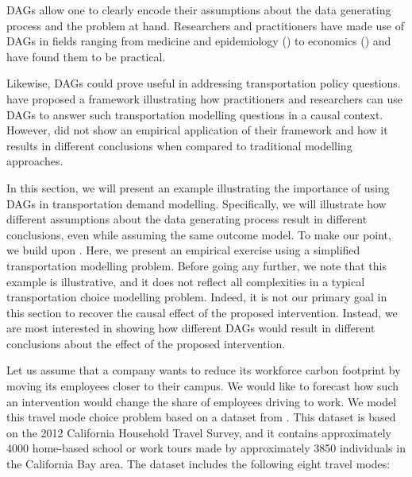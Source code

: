 DAGs allow one to clearly encode their assumptions about the data generating process and the problem at hand.
Researchers and practitioners have made use of DAGs in fields ranging from medicine and epidemiology (\citet{shrier_2008_reducing, sung_2012_reducing}) to economics (\citet{white_2011_covariate}) and have found them to be practical.

Likewise, DAGs could prove useful in addressing transportation policy questions.
\citet{brathwaite_2018_causal} have proposed a framework illustrating how practitioners and researchers can use DAGs to answer such transportation modelling questions in a causal context.
However, \citet{brathwaite_2018_causal} did not show an empirical application of their framework and how it results in different conclusions when compared to traditional modelling approaches.

In this section, we will present an example illustrating the importance of using DAGs in transportation demand modelling.
Specifically, we will illustrate how different assumptions about the data generating process result in different conclusions, even while assuming the same outcome model.
To make our point, we build upon \citet{brathwaite_2018_causal}.
Here, we present an empirical exercise using a simplified transportation modelling problem.
Before going any further, we note that this example is illustrative, and it does not reflect all complexities in a typical transportation choice modelling problem.
Indeed, it is not our primary goal in this section to recover the causal effect of the proposed intervention.
Instead, we are most interested in showing how different DAGs would result in different conclusions about the effect of the proposed intervention.

Let us assume that a company wants to reduce its workforce carbon footprint by moving its employees closer to their campus.
We would like to forecast how such an intervention would change the share of employees driving to work.
We model this travel mode choice problem based on a dataset from \citet{brathwaite_asymmetric}.
This dataset is based on the 2012 California Household Travel Survey, and it
contains approximately 4000 home-based school or work tours made by approximately 3850 individuals in the California Bay area.
The dataset includes the following eight travel modes:

